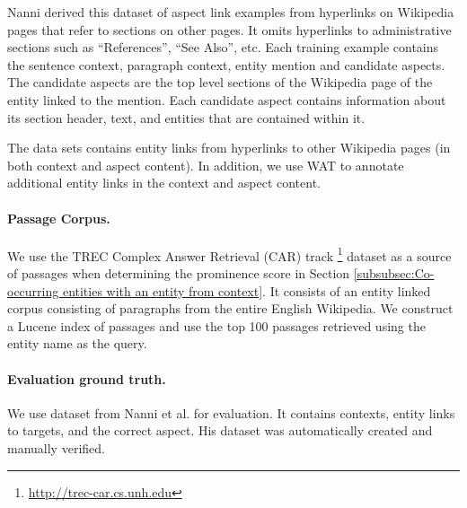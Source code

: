 Nanni derived this dataset of aspect link examples from hyperlinks on Wikipedia pages that refer to sections on other pages.  It omits hyperlinks to administrative sections such as ``References'', ``See Also'', etc. Each training example contains the sentence context, paragraph context, entity mention and candidate aspects. The candidate aspects are the top level sections of the Wikipedia page of the entity linked to the mention. 
Each candidate aspect contains information about its section header, text, and entities that are contained within it.

The data sets contains entity links from hyperlinks to other Wikipedia pages (in both context and aspect content). In addition, we use WAT \cite{piccinno2014wat} to annotate additional entity links in the context and aspect content.


\paragraph{\textbf{Passage Corpus.}}
We use the TREC Complex Answer Retrieval (CAR) track \cite{dietz2018trec}\footnote{\url{http://trec-car.cs.unh.edu}} dataset as a source of passages when determining the prominence score in Section \ref{subsubsec:Co-occurring entities with an entity from context}. It consists of an entity linked corpus consisting of paragraphs from the entire English Wikipedia. We construct a Lucene index of passages and use the top 100 passages retrieved using the entity name as the query.


    
    


\paragraph{\textbf{Evaluation ground truth.}}
We use dataset from Nanni et al. \cite{nanni2018entity} for evaluation. It contains contexts, entity links to targets, and the correct aspect. His dataset was automatically created and manually verified. %
%

